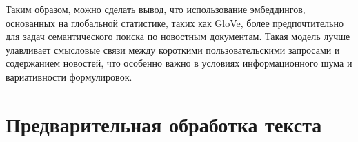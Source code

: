 \documentclass[coursework]{SCWorks}
\begin{document}
Таким образом, можно сделать вывод, что использование эмбеддингов, основанных на глобальной статистике, таких как GloVe, более предпочтительно для задач семантического поиска по новостным документам. Такая модель лучше улавливает смысловые связи между короткими пользовательскими запросами и содержанием новостей, что особенно важно в условиях информационного шума и вариативности формулировок.




\appendix
\section{Предварительная обработка текста}
\label{apx:tokenization}
\end{document}
